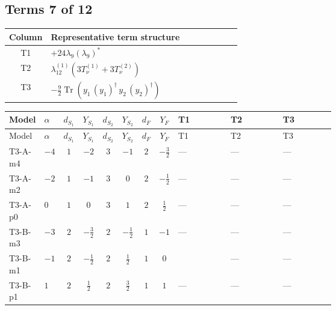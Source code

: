 \documentclass[8pt]{article}
\begin{document}
\begin{landscape}
\subsection*{Terms 7 of 12}
\begin{center}
\begin{tabular}{@{}c >{\raggedright\arraybackslash}p{0.82\linewidth}@{}}
\toprule
Column & Representative term structure \\
\midrule
T1 & \(\displaystyle +24 {\lambda_{9}} \left({\lambda_{9}}\right)^{*}\) \\
\midrule
T2 & \(\displaystyle {\lambda_{12}^{(1)}} (3 T_{\nu}^{(1)}+3 T_{\nu}^{(2)})\) \\
\midrule
T3 & \(\displaystyle -\frac{9}{2} \operatorname{Tr}\!\left({y_1}\,\left({y_1}\right)^{\dagger}\,{y_2}\,\left({y_2}\right)^{\dagger}\right)\) \\
\midrule
\bottomrule
\end{tabular}
\end{center}
\smallskip
\tiny
\begin{longtable}{@{}llcccccc >{\raggedright\arraybackslash}p{0.21\linewidth} >{\raggedright\arraybackslash}p{0.21\linewidth} >{\raggedright\arraybackslash}p{0.21\linewidth}@{}}
\toprule
Model & $\alpha$ & $d_{S_1}$ & $Y_{S_1}$ & $d_{S_2}$ & $Y_{S_2}$ & $d_F$ & $Y_F$ & T1 & T2 & T3 \\
\midrule
\endfirsthead
\toprule
Model & $\alpha$ & $d_{S_1}$ & $Y_{S_1}$ & $d_{S_2}$ & $Y_{S_2}$ & $d_F$ & $Y_F$ & T1 & T2 & T3 \\
\midrule
\endhead
T3-A-m4 & $-4$ & $1$ & $-2$ & $3$ & $-1$ & $2$ & $-\frac{3}{2}$ & --- & --- & --- \\
\midrule
T3-A-m2 & $-2$ & $1$ & $-1$ & $3$ & $0$ & $2$ & $-\frac{1}{2}$ & --- & --- & --- \\
\midrule
T3-A-p0 & $0$ & $1$ & $0$ & $3$ & $1$ & $2$ & $\frac{1}{2}$ & --- & --- & --- \\
\midrule
T3-B-m3 & $-3$ & $2$ & $-\frac{3}{2}$ & $2$ & $-\frac{1}{2}$ & $1$ & $-1$ & --- & --- & --- \\
\midrule
T3-B-m1 & $-1$ & $2$ & $-\frac{1}{2}$ & $2$ & $\frac{1}{2}$ & $1$ & $0$ & \scriptsize\adjustbox{max width=\linewidth}{$\begin{gathered} +24 {\lambda_{9}} \left({\lambda_{9}}\right)^{*}\end{gathered}$} & --- & --- \\
\midrule
T3-B-p1 & $1$ & $2$ & $\frac{1}{2}$ & $2$ & $\frac{3}{2}$ & $1$ & $1$ & --- & --- & --- \\

\end{longtable}
\end{landscape}
\end{document}
